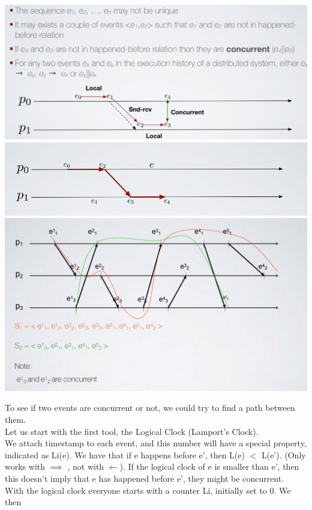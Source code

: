 \documentclass[11pt, a4paper]{article}
\begin{document}
\begin{center}
    \includegraphics[scale=0.5]{img/logical time/hprel1.png}
    \includegraphics[scale=0.6]{img/logical time/hprel2.png}
    \includegraphics[scale=0.5]{img/logical time/ex1.png}
\end{center}
To see if two events are concurrent or not, we could try to find a path between
them.\\
Let us start with the first tool, the Logical Clock (Lamport's Clock).\\
We attach timestamp to each event, and this number will have a special property,
indicated as Li(e). We have that if e happens before e', then L(e) $<$ L(e'). (Only
works with $\implies$ , not with $\leftarrow$). If the logical clock of e is smaller than e', then this
doesn't imply that e has happened before e', they might be concurrent.\\
With the logical clock everyone starts with a counter Li, initially set to 0. We then
\end{document}

